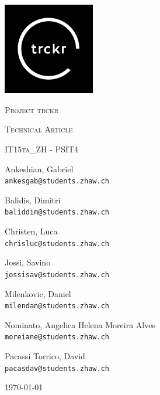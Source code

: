 \documentclass[bibliography=totoc, listof=totocnumbered]{scrartcl}
\begin{document}
\begin{titlepage}
\thispagestyle{firstpage}
\centering
\includegraphics[width=0.3\textwidth]{logo}\par
\vspace{1cm}

{\scshape\LARGE Project trckr \par}
\vspace{0.3cm}

{\scshape\Large Technical Article\par}
\vspace{0.5cm}

{\scshape IT15ta\_ZH - PSIT4\par}
\vspace{0.5cm}
Ankeshian, Gabriel\\
\texttt{ankesgab@students.zhaw.ch}

\vspace{0.2cm}
Balidis, Dimitri\\
\texttt{baliddim@students.zhaw.ch}

\vspace{0.2cm}
Christen, Luca\\
\texttt{chrisluc@students.zhaw.ch}

\vspace{0.2cm}
Jossi, Savino\\
\texttt{jossisav@students.zhaw.ch}

\vspace{0.2cm}
Milenkovic, Daniel\\
\texttt{milendan@students.zhaw.ch}

\vspace{0.2cm}
Nominato, Angelica Helena Moreira Alves\\
\texttt{moreiane@students.zhaw.ch}

\vspace{0.2cm}
Pacassi Torrico, David\\
\texttt{pacasdav@students.zhaw.ch}

\vfill

	{\large \today\par}
\end{titlepage}
\end{document}
